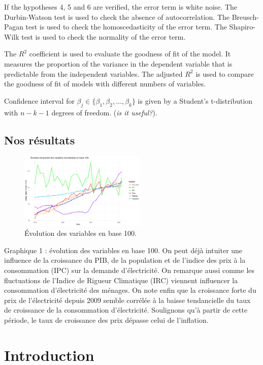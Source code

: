 If the hypotheses 4, 5 and 6 are verified, the error term is white noise. The Durbin-Watson test is used to check the absence of autocorrelation. The Breusch-Pagan test is used to check the homoscedasticity of the error term. The Shapiro-Wilk test is used to check the normality of the error term.

The $R^2$ coefficient is used to evaluate the goodness of fit of the model. It measures the proportion of the variance in the dependent variable that is predictable from the independent variables. The adjusted $R^2$ is used to compare the goodness of fit of models with different numbers of variables.

Confidence interval for $\beta_j \in \{\beta_1, \beta_2, \ldots, \beta_k\}$ is given by a Student's t-distribution with $n - k - 1$ degrees of freedom. (\textit{is it useful?}). \\



\subsection{Nos résultats}
\begin{figure}[h]
    \centering
      \includegraphics[width=0.54\textwidth]{Images/data_base100_2015.jpeg}
      \caption{Évolution des variables en base 100.}
          \label{var}
  \end{figure}

Graphique 1 : évolution des variables en base 100. On peut déjà intuiter une influence de la croissance du PIB, de la population et de l'indice des prix à la consommation (IPC) sur la demande d'électricité. On remarque aussi comme les fluctuations de l'Indice de Rigueur Climatique (IRC) viennent influencer la consommation d'électricité des ménages. On note enfin que la croissance forte du prix de l'électricité depuis 2009 semble corrélée à la baisse tendancielle du taux de croissance de la consommation d'électricité. Soulignons qu'à partir de cette période, le taux de croissance des prix dépasse celui de l'inflation.

\section{Introduction}
